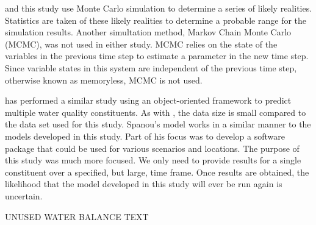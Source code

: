 \citeauthor{Mueller2008} and this study use Monte Carlo simulation to determine a series of likely realities.  Statistics are taken of these likely realities to determine a probable range for the simulation results.  Another simultation method, Markov Chain Monte Carlo (MCMC), was not used in either study.  MCMC relies on the state of the variables in the previous time step to estimate a parameter in the new time step.  Since variable states in this system are independent of the previous time step, otherwise known as memoryless, MCMC is not used.

\citet{Spanou2001} has performed a similar study using an object-oriented framework to predict multiple water quality constituents.  As with \citet{Mueller2008}, the data size is small compared to the data set used for this study.  Spanou's model works in a similar manner to the models developed in this study.  Part of his focus was to develop a software package that could be used for various scenarios and locations.  The purpose of this study was much more focused.  We only need to provide results for a single constituent over a specified, but large, time frame.  Once results are obtained, the likelihood that the model developed in this study will ever be run again is uncertain.




UNUSED WATER BALANCE TEXT



